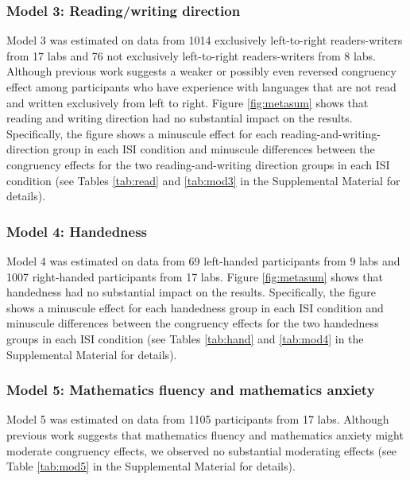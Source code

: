 \documentclass[man,floatsintext]{apa6}
\theoremstyle{definition}
\theoremstyle{definition}
\theoremstyle{definition}
\theoremstyle{remark}
\begin{document}
\subsubsection{Model 3: Reading/writing
direction}\label{model-3-readingwriting-direction-1}

Model 3 was estimated on data from 1014 exclusively left-to-right
readers-writers from 17 labs and 76 not exclusively left-to-right
readers-writers from 8 labs. Although previous work suggests a weaker or
possibly even reversed congruency effect among participants who have
experience with languages that are not read and written exclusively from
left to right. Figure \ref{fig:metasum} shows that reading and writing
direction had no substantial impact on the results. Specifically, the
figure shows a minuscule effect for each reading-and-writing-direction
group in each ISI condition and minuscule differences between the
congruency effects for the two reading-and-writing direction groups in
each ISI condition (see Tables \ref{tab:read} and \ref{tab:mod3} in the
Supplemental Material for details).

\subsubsection{Model 4: Handedness}\label{model-4-handedness-1}

Model 4 was estimated on data from 69 left-handed participants from 9
labs and 1007 right-handed participants from 17 labs. Figure
\ref{fig:metasum} shows that handedness had no substantial impact on the
results. Specifically, the figure shows a minuscule effect for each
handedness group in each ISI condition and minuscule differences between
the congruency effects for the two handedness groups in each ISI
condition (see Tables \ref{tab:hand} and \ref{tab:mod4} in the
Supplemental Material for details).

\subsubsection{Model 5: Mathematics fluency and mathematics
anxiety}\label{model-5-mathematics-fluency-and-mathematics-anxiety-1}

Model 5 was estimated on data from 1105 participants from 17 labs.
Although previous work suggests that mathematics fluency and mathematics
anxiety might moderate congruency effects, we observed no substantial
moderating effects (see Table \ref{tab:mod5} in the Supplemental
Material for details).
\end{document}
